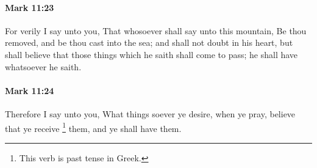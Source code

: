 		\paragraph{Mark 11:23} %
			\label{MARK-11-23}

			For verily I say unto you, That whosoever shall say unto this mountain, Be thou removed, and be thou cast into the sea; and shall not doubt in his heart, but shall believe that those things which he saith shall come to pass; he shall have whatsoever he saith.

			\begin{framed}
			\scriptsize
				\begin{compactdesc}
					\item[SBLG] 
				\end{compactdesc}
			\end{framed}

		\paragraph{Mark 11:24} %
			\label{MARK-11-24}

			Therefore I say unto you, What things soever ye desire, when ye pray, believe that ye receive%
				\footnote{%
					This verb is past tense in Greek.
					}
			them, and ye shall have them.

